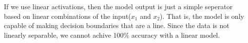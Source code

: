 \begin{answer}
If we use linear activations, then the model output is just a simple seperator based on linear combinations of the input($x_1$ and $x_2$). That is, the model is only capable of making decision boundaries that are a line. Since the data is not linearly separable, we cannot achive 100\% accuracy with a linear model.
\end{answer}
